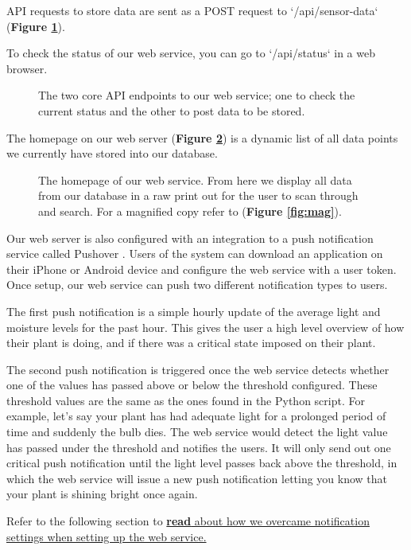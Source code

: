 \documentclass[a4paper]{article}
\begin{document}
API requests to store data are sent as a POST request to `/api/sensor-data` (\textbf{Figure \ref{fig:4}}).

To check the status of our web service, you can go to `/api/status` in a web browser.

\begin{figure}
  \caption{The two core API endpoints to our web service; one to check the current status and the other to post data to be stored.}
  \label{fig:4}
\end{figure}

The homepage on our web server (\textbf{Figure \ref{fig:5}}) is a dynamic list of all data points we currently have stored into our database.

\begin{figure}
  \caption{The homepage of our web service. From here we display all data from our database in a raw print out for the user to scan through and search. For a magnified copy refer to (\textbf{Figure \ref{fig:mag}}).}
  \label{fig:5}
\end{figure}

Our web server is also configured with an integration to a push notification service called Pushover \cite{pushover}. Users of the system can download an application on their iPhone or Android device and configure the web service with a user token. Once setup, our web service can push two different notification types to users.

The first push notification is a simple hourly update of the average light and moisture levels for the past hour. This gives the user a high level overview of how their plant is doing, and if there was a critical state imposed on their plant.

The second push notification is triggered once the web service detects whether one of the values has passed above or below the threshold configured. These threshold values are the same as the ones found in the Python script. For example, let’s say your plant has had adequate light for a prolonged period of time and suddenly the bulb dies. The web service would detect the light value has passed under the threshold and notifies the users. It will only send out one critical push notification until the light level passes back above the threshold, in which the web service will issue a new push notification letting you know that your plant is shining bright once again. 

Refer to the following section to \hyperref[sec:pushover]{\textbf{read} about how we overcame notification settings when setting up the web service.}
\end{document}
